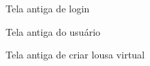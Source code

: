 \begin{figure}[H]
  \centering
  \caption{Tela antiga de login}\label{figura:loginAntigo}
\end{figure}

\begin{figure}[H]
  \centering
  \caption{Tela antiga do usuário}\label{figura:indexAntigo}
\end{figure}

\begin{figure}[H]
  \centering
  \caption{Tela antiga de criar lousa virtual}\label{figura:criarAntigo}
\end{figure}


